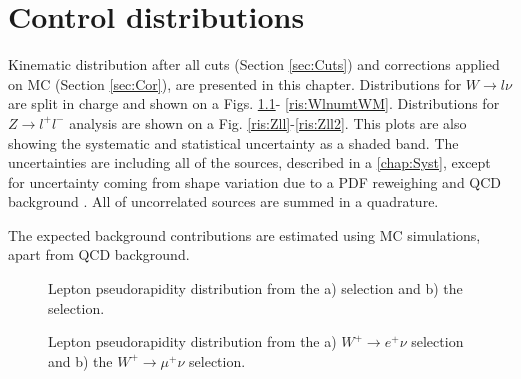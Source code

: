 \chapter{Control distributions}

Kinematic distribution after all cuts (Section \ref{sec:Cuts}) and corrections applied on MC (Section \ref{sec:Cor}), are presented in this chapter. Distributions for $W \to l\nu$ are split in charge and shown on a Figs. \ref{ris:WlnuLep}- \ref{ris:WlnumtWM}. Distributions for $Z \to l^{+}l^{-}$ analysis are shown on a Fig. \ref{ris:Zll}-\ref{ris:Zll2}.  This plots are also showing the systematic and statistical uncertainty as a shaded band. The uncertainties are including all of the sources, described in a \ref{chap:Syst}, except for uncertainty coming from shape variation due to a PDF reweighing and QCD background .  All of uncorrelated sources are summed in a quadrature. 

The expected background contributions are estimated using MC simulations, apart from QCD background. 


\begin{figure}[h]
\begin{minipage}[h]{0.49\linewidth}
\end{minipage}
\hfill
\begin{minipage}[h]{0.49\linewidth}
\end{minipage}
\caption{Lepton pseudorapidity distribution from the a) \wenu selection and  b) the \wmunu selection.}
\label{ris:WlnuLep}
\end{figure}

\begin{figure}[h]
\begin{minipage}[h]{0.49\linewidth}
\end{minipage}
\hfill
\begin{minipage}[h]{0.49\linewidth}
\end{minipage}
\label{ris:WlnuPLep}
\caption{Lepton pseudorapidity distribution from the a) $W^{+} \to e^{+} \nu$ selection and  b) the $W^{+} \to \mu^{+} \nu$ selection.}
\end{figure}

